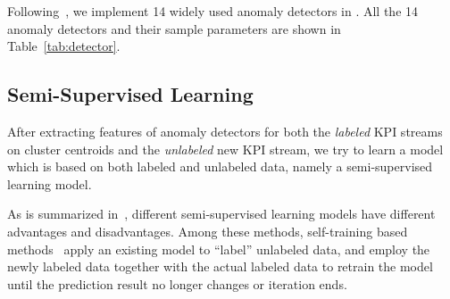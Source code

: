 Following~\cite{liu2015opprentice}, we implement 14 widely used anomaly detectors in \name.
All the 14 anomaly detectors and their sample parameters are shown in Table~\ref{tab:detector}.




\subsection{Semi-Supervised Learning}\label{subsubsec:semi_supervised_model}

 
After extracting features of anomaly detectors for both the \emph{labeled} KPI streams on cluster centroids and the \emph{unlabeled} new KPI stream, we try to learn a model which is based on both labeled and unlabeled data, namely a semi-supervised learning model.


As is summarized in~\cite{chapelle2009semi}, different semi-supervised learning models have different advantages and disadvantages.
Among these methods, self-training based methods~\cite{rosenberg2005semi} apply an existing model to ``label'' unlabeled data, and employ the newly labeled data together with the actual labeled data to retrain the model until the prediction result no longer changes or iteration ends.

